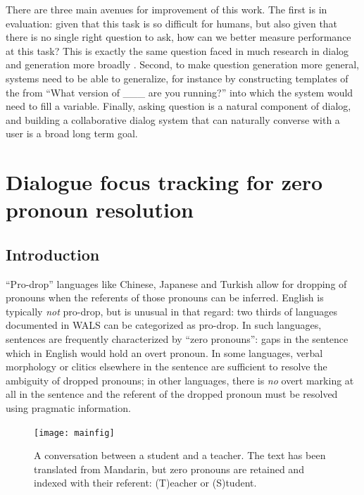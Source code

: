 \documentclass[11pt]{report}
\renewcommand\cite{\citep}	%
\begin{document}
There are three main avenues for improvement of this work.
The first is in evaluation: given that this task is so difficult for humans, but also given that there is no single right question to ask, how can we better measure performance at this task?
This is exactly the same question faced in much research in dialog and generation more broadly \cite{paek2001empirical,lowe2015ubuntu,liu2016not,kannan2017adversarial}.
Second, to make question generation more general, systems need to be able to generalize, for instance by constructing templates of the from ``What version of \_\_\_ are you running?'' into which the system would need to fill a variable. Finally, asking question is a natural component of dialog, and building a collaborative dialog system that can naturally converse with a user is a broad long term goal.

\newpage

\chapter{Dialogue focus tracking for zero pronoun resolution}\label{dialogue_focus_tracking}

\section{Introduction}

``Pro-drop'' languages like Chinese, Japanese and Turkish allow for dropping of pronouns when the referents of those pronouns can be inferred. English is typically 
\emph{not} pro-drop, but is unusual in that regard: two thirds of languages documented in WALS \cite{wals} can be categorized as pro-drop. In such languages, sentences are frequently characterized by ``zero pronouns'': gaps in the sentence which in English would hold an overt pronoun. In some languages, verbal morphology or clitics elsewhere in the sentence are sufficient to resolve the ambiguity of dropped pronouns; in other languages, there is \emph{no} overt marking at all in the sentence and the referent of the dropped pronoun must be resolved using pragmatic information.

\begin{figure}
\centering
\texttt{[image: mainfig]}
\caption{A conversation between a student and a teacher. The text has been translated from Mandarin, but zero pronouns are retained and indexed with their referent: (T)eacher or (S)tudent.}%
\label{sms-ex}
\end{figure}
\end{document}
